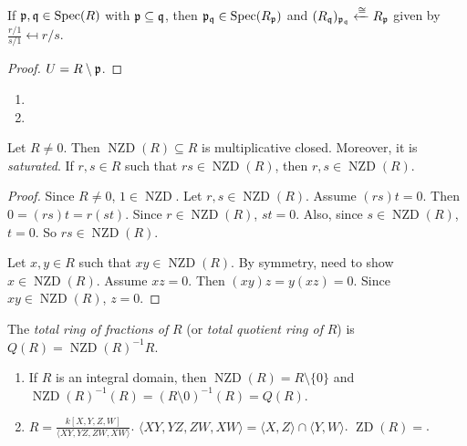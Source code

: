\begin{corollary}
    If $\mathfrak{p},\mathfrak{q} \in \operatorname{Spec}(R)$ with $\mathfrak{p} \subseteq \mathfrak{q}$, then $\mathfrak{p}_{\mathfrak{q}} \in \operatorname{Spec}(R_{\mathfrak{p}})$ and $(R_{\mathfrak{q}})_{\mathfrak{p}_{\mathfrak{q}}} \xleftarrow \cong R_{\mathfrak{p}}$ given by $\frac{r/1}{s/1} \mapsfrom r/s$.
\end{corollary}

\begin{proof}
    $U = R \setminus \mathfrak{p}$.
\end{proof}

\begin{example}
    \begin{enumerate}
        \item 
        \item 
    \end{enumerate}
\end{example}

\begin{proposition}
    Let $R \neq 0$. Then $\operatorname{NZD}(R) \subseteq R$ is multiplicative closed. Moreover, it is \emph{saturated}. If $r,s \in R$ such that $rs \in \operatorname{NZD}(R)$, then $r,s \in \operatorname{NZD}(R)$.
\end{proposition}

\begin{proof}
    Since $R \neq 0$, $1 \in \operatorname{NZD}$. Let $r,s \in \operatorname{NZD}(R)$. Assume $(rs)t=0$. Then $0 = (rs)t = r(st)$. Since $r \in \operatorname{NZD}(R)$, $st = 0$. Also, since $s \in \operatorname{NZD}(R)$, $t = 0$. So $rs \in \operatorname{NZD}(R)$. \par 
    Let $x,y \in R$ such that $xy \in \operatorname{NZD}(R)$. By symmetry, need to show $x \in \operatorname{NZD}(R)$. Assume $xz = 0$. Then $(xy)z = y(xz) = 0$. Since $xy \in \operatorname{NZD}(R)$, $z = 0$.
\end{proof}

\begin{definition}
    The \emph{total ring of fractions of} $R$ (or \emph{total quotient ring of }$R$) is $Q(R) = \operatorname{NZD}(R)^{-1}R$.
\end{definition}

\begin{example}
    \begin{enumerate}
        \item If $R$ is an integral domain, then $\operatorname{NZD}(R) = R \setminus \{0\}$ and $\operatorname{NZD}(R)^{-1}(R) = (R \setminus 0)^{-1}(R) = Q(R)$.
        \item $R = \frac{k[X,Y,Z,W]}{\langle XY,YZ,ZW,XW \rangle}$. $\langle XY,YZ,ZW,XW \rangle = \langle X,Z \rangle \cap \langle Y,W \rangle$. $\operatorname{ZD}(R) = $.
    \end{enumerate}
\end{example}

